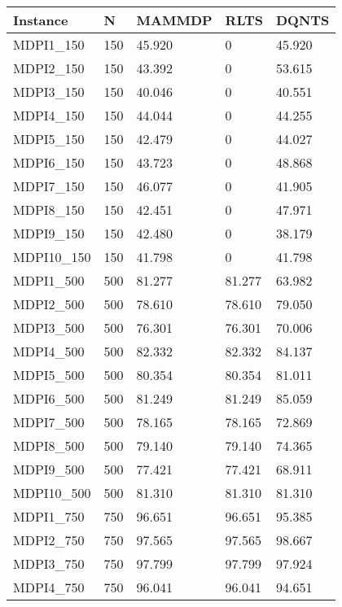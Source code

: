 \begin{center}
  \begin{tabular}{ l|l|l|l|l }
    \hline
    \textbf{Instance} & \textbf{N} & \textbf{MAMMDP} & \textbf{RLTS} & \textbf{DQNTS} \\ \hline
    MDPI1\_150 & 150 & 45.920 & 0 & 45.920 \\ \hline
    MDPI2\_150 & 150 & 43.392 & 0 & 53.615 \\ \hline
    MDPI3\_150 & 150 & 40.046 & 0 & 40.551 \\ \hline
    MDPI4\_150 & 150 & 44.044 & 0 & 44.255 \\ \hline
    MDPI5\_150 & 150 & 42.479 & 0 & 44.027 \\ \hline
    MDPI6\_150 & 150 & 43.723 & 0 & 48.868 \\ \hline
    MDPI7\_150 & 150 & 46.077 & 0 & 41.905 \\ \hline
    MDPI8\_150 & 150 & 42.451 & 0 & 47.971 \\ \hline
    MDPI9\_150 & 150 & 42.480 & 0 & 38.179 \\ \hline
    MDPI10\_150 & 150 & 41.798 & 0 & 41.798 \\ \hline
    \hline
    MDPI1\_500 & 500 & 81.277 & 81.277  & 63.982 \\ \hline
    MDPI2\_500 & 500 & 78.610 & 78.610  & 79.050 \\ \hline
    MDPI3\_500 & 500 & 76.301 & 76.301  & 70.006 \\ \hline
    MDPI4\_500 & 500 & 82.332 & 82.332  & 84.137 \\ \hline
    MDPI5\_500 & 500 & 80.354 & 80.354  & 81.011 \\ \hline
    MDPI6\_500 & 500 & 81.249 & 81.249  & 85.059 \\ \hline
    MDPI7\_500 & 500 & 78.165 & 78.165  & 72.869 \\ \hline
    MDPI8\_500 & 500 & 79.140 & 79.140  & 74.365 \\ \hline
    MDPI9\_500 & 500 & 77.421 & 77.421  & 68.911 \\ \hline
    MDPI10\_500 & 500 & 81.310 & 81.310  & 81.310 \\ \hline
    \hline
    MDPI1\_750 & 750 & 96.651 & 96.651 & 95.385 \\ \hline
    MDPI2\_750 & 750 & 97.565 & 97.565 & 98.667 \\ \hline
    MDPI3\_750 & 750 & 97.799 & 97.799 & 97.924 \\ \hline
    MDPI4\_750 & 750 & 96.041 & 96.041 & 94.651 \\ \hline

\end{tabular}
\end{center}
